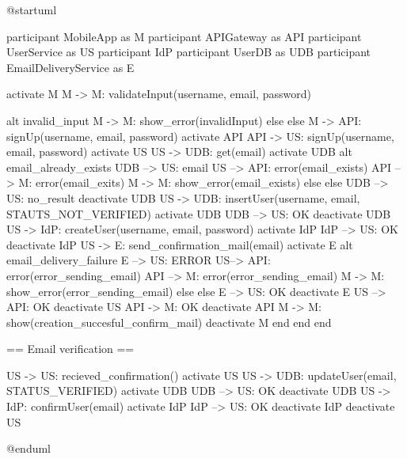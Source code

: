 @startuml

participant MobileApp as M
participant APIGateway as API
participant UserService as US
participant IdP
participant UserDB as UDB
participant EmailDeliveryService as E

activate M
M -> M: validateInput(username, email, password)

alt invalid_input
M -> M: show_error(invalidInput)
else else
M -> API: signUp(username, email, password)
activate API
API -> US: signUp(username, email, password)
activate US
US -> UDB: get(email)
activate UDB
alt email_already_exists
UDB --> US: email
US --> API: error(email_exists)
API --> M: error(email_exits)
M -> M: show_error(email_exists)
else else
UDB --> US: no_result
deactivate UDB
US -> UDB: insertUser(username, email, STAUTS_NOT_VERIFIED)
activate UDB
UDB --> US: OK
deactivate UDB
US -> IdP: createUser(username, email, password)
activate IdP
IdP --> US: OK
deactivate IdP
US -> E: send_confirmation_mail(email)
activate E
alt email_delivery_failure
E --> US: ERROR
US--> API: error(error_sending_email)
API --> M: error(error_sending_email)
M -> M: show_error(error_sending_email)
else else
E --> US: OK
deactivate E
US --> API: OK
deactivate US
API -> M: OK
deactivate API
M -> M: show(creation_succesful_confirm_mail)
deactivate M
end 
end
end

== Email verification ==


US -> US: recieved_confirmation()
activate US
US -> UDB: updateUser(email, STATUS_VERIFIED)
activate UDB
UDB --> US: OK
deactivate UDB
US -> IdP: confirmUser(email)
activate IdP
IdP --> US: OK
deactivate IdP
deactivate US


@enduml